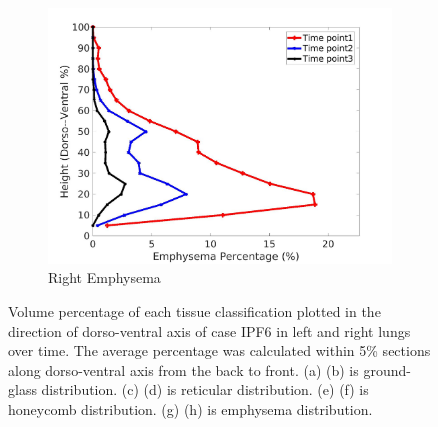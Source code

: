 \begin{figure}[H]
\begin{subfigure}{.42\linewidth}
  \includegraphics[width=\linewidth,trim={{.0\wd0} {.0\wd0} {.0\wd0} {.0\wd0}},clip]{Appendix/Image_AppexA/DorsoToVentral/IPF6RightLungEmphysemaDiseaseDorsoToVentral.jpg}
  \caption{Right Emphysema}
  \label{fig:IPF6DiseaseDorsoToVentral-h}
\end{subfigure}
\caption{Volume percentage of each tissue classification plotted in the direction of dorso-ventral axis of case IPF6 in left and right lungs over time. The average percentage was calculated within 5\% sections along dorso-ventral axis from the back to front. (a) (b) is ground-glass distribution. (c) (d) is reticular distribution. (e) (f) is honeycomb distribution. (g) (h) is emphysema distribution.}
\label{fig:IPF6DiseaseDorsoToVentral}
\end{figure}

